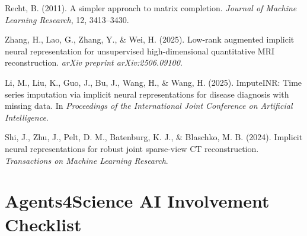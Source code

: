 \documentclass{article}
\begin{document}
\begin{thebibliography}{99}
Recht, B. (2011). A simpler approach to matrix completion. \emph{Journal of Machine Learning Research}, 12, 3413--3430.

Zhang, H., Lao, G., Zhang, Y., \& Wei, H. (2025). Low-rank augmented implicit neural representation for unsupervised high-dimensional quantitative MRI reconstruction. \emph{arXiv preprint arXiv:2506.09100}.

Li, M., Liu, K., Guo, J., Bu, J., Wang, H., \& Wang, H. (2025). ImputeINR: Time series imputation via implicit neural representations for disease diagnosis with missing data. In \emph{Proceedings of the International Joint Conference on Artificial Intelligence}.

Shi, J., Zhu, J., Pelt, D. M., Batenburg, K. J., \& Blaschko, M. B. (2024). Implicit neural representations for robust joint sparse-view CT reconstruction. \emph{Transactions on Machine Learning Research}.

\end{thebibliography}

\newpage

\section*{Agents4Science AI Involvement Checklist}
\end{document}
